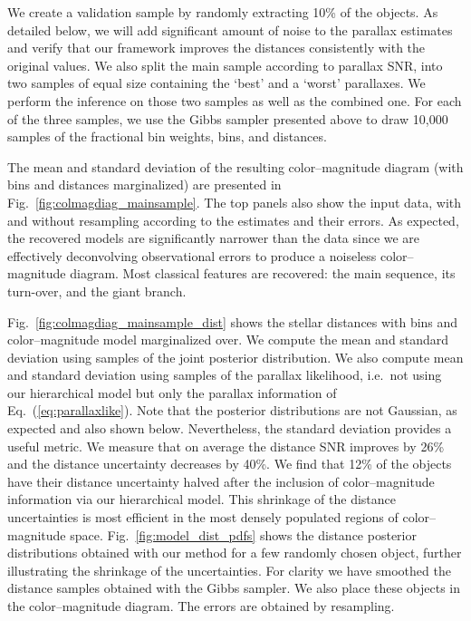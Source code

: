 \documentclass[manuscript, letterpaper]{aastex6}
\newcommand{\ie}{{{i.e.}~}}
\newcommand{\equref}[1]{{\xspace}Eq.~(\ref{#1})}
\newcommand{\figref}[1]{{\xspace}Fig.~\ref{#1}}
\begin{document}
We create a validation sample by randomly extracting 10\% of the objects. 
As detailed below, we will add significant amount of noise to the parallax estimates and verify that our framework improves the distances consistently with the original values. 
We also split the main sample according to parallax SNR, into two samples of equal size containing the `best' and a `worst' parallaxes. 
We perform the inference on those two samples as well as the combined one. 
For each of the three samples, we use the Gibbs sampler presented above to draw 10,000 samples of the fractional bin weights, bins, and distances. 

The mean and standard deviation of the resulting color--magnitude diagram (with bins and distances marginalized) are presented in \figref{fig:colmagdiag_mainsample}.
The top panels also show the input data, with and without resampling according to the estimates and their errors.
As expected, the recovered models are significantly narrower than the data since we are effectively deconvolving observational errors to produce a noiseless color--magnitude diagram. 
Most classical features are recovered: the main sequence, its turn-over, and the giant branch.

\figref{fig:colmagdiag_mainsample_dist} shows the stellar distances with bins and color--magnitude model marginalized over. 
We compute the mean and standard deviation using samples of the joint posterior distribution. 
We also compute mean and standard deviation using samples of the parallax likelihood, \ie not using our hierarchical model but only the parallax information of \equref{eq:parallaxlike}.
Note that the posterior distributions are not Gaussian, as expected and also shown below. 
Nevertheless, the standard deviation provides a useful metric. 
We measure that on average the distance SNR improves by 26\% and the distance uncertainty decreases by 40\%.
We find that 12\% of the objects have their distance uncertainty halved after the inclusion of color--magnitude information via our hierarchical model.
This shrinkage of the distance uncertainties is most efficient in the most densely populated regions of color--magnitude space.
\figref{fig:model_dist_pdfs} shows the distance posterior distributions obtained with our method for a few randomly chosen object, further illustrating the shrinkage of the uncertainties.
For clarity we have smoothed the distance samples obtained with the Gibbs sampler.
We also place these objects in the color--magnitude diagram.
The errors are obtained by resampling.
\end{document}

